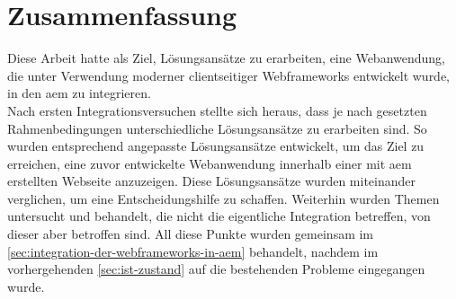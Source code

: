 \chapter{Zusammenfassung}
\label{sec:zusammenfassung}

Diese Arbeit hatte als Ziel, Lösungsansätze zu erarbeiten, eine Webanwendung, die unter Verwendung moderner clientseitiger Webframeworks entwickelt wurde, in den \acl{aem} zu integrieren. \\
Nach ersten Integrationsversuchen stellte sich heraus, dass je nach gesetzten Rahmenbedingungen unterschiedliche Lösungsansätze zu erarbeiten sind. So wurden entsprechend angepasste Lösungsansätze entwickelt, um das Ziel zu erreichen, eine zuvor entwickelte Webanwendung innerhalb einer mit \ac{aem} erstellten Webseite anzuzeigen. Diese Lösungsansätze wurden miteinander verglichen, um eine Entscheidungshilfe zu schaffen. Weiterhin wurden Themen untersucht und behandelt, die nicht die eigentliche Integration betreffen, von dieser aber betroffen sind. All diese Punkte wurden gemeinsam im \autoref{sec:integration-der-webframeworks-in-aem} behandelt, nachdem im vorhergehenden \autoref{sec:ist-zustand} auf die bestehenden Probleme eingegangen wurde.






